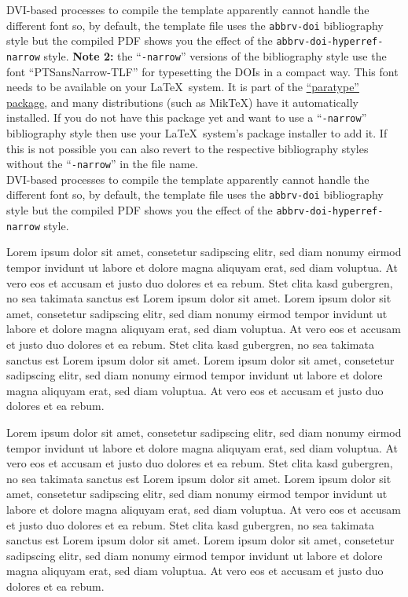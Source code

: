 \documentclass[preprint,journal]{vgtc}       %
\begin{document}
\begin{itemize}
DVI-based processes to compile the template apparently cannot handle the different font so, by default, the template file uses the \texttt{abbrv-doi} bibliography style but the compiled PDF shows you the effect of the \texttt{abbrv-doi-hyperref-narrow} style.
\textbf{Note 2:} the ``\texttt{-narrow}'' versions of the bibliography style use the font ``PTSansNarrow-TLF'' for typesetting the DOIs in a compact way. This font needs to be available on your \LaTeX\ system. It is part of the \href{https://www.ctan.org/pkg/paratype}{``paratype'' package}, and many distributions (such as MikTeX) have it automatically installed. If you do not have this package yet and want to use a ``\texttt{-narrow}'' bibliography style then use your \LaTeX\ system's package installer to add it. If this is not possible you can also revert to the respective bibliography styles without the ``\texttt{-narrow}'' in the file name.\\[1em]
DVI-based processes to compile the template apparently cannot handle the different font so, by default, the template file uses the \texttt{abbrv-doi} bibliography style but the compiled PDF shows you the effect of the \texttt{abbrv-doi-hyperref-narrow} style.
\end{itemize}

Lorem ipsum dolor sit amet, consetetur sadipscing elitr, sed diam
nonumy eirmod tempor invidunt ut labore et dolore magna aliquyam erat,
sed diam voluptua. At vero eos et accusam et justo duo dolores et ea
rebum. Stet clita kasd gubergren, no sea takimata sanctus est Lorem
ipsum dolor sit amet. Lorem ipsum dolor sit amet, consetetur
sadipscing elitr, sed diam nonumy eirmod tempor invidunt ut labore et
dolore magna aliquyam erat, sed diam voluptua. At vero eos et accusam
et justo duo dolores et ea rebum. Stet clita kasd gubergren, no sea
takimata sanctus est Lorem ipsum dolor sit amet. Lorem ipsum dolor sit
amet, consetetur sadipscing elitr, sed diam nonumy eirmod tempor
invidunt ut labore et dolore magna aliquyam erat, sed diam
voluptua. At vero eos et accusam et justo duo dolores et ea
rebum.

Lorem ipsum dolor sit amet, consetetur sadipscing elitr, sed diam
nonumy eirmod tempor invidunt ut labore et dolore magna aliquyam erat,
sed diam voluptua. At vero eos et accusam et justo duo dolores et ea
rebum. Stet clita kasd gubergren, no sea takimata sanctus est Lorem
ipsum dolor sit amet. Lorem ipsum dolor sit amet, consetetur
sadipscing elitr, sed diam nonumy eirmod tempor invidunt ut labore et
dolore magna aliquyam erat, sed diam voluptua. At vero eos et accusam
et justo duo dolores et ea rebum. Stet clita kasd gubergren, no sea
takimata sanctus est Lorem ipsum dolor sit amet. Lorem ipsum dolor sit
amet, consetetur sadipscing elitr, sed diam nonumy eirmod tempor
invidunt ut labore et dolore magna aliquyam erat, sed diam
voluptua. At vero eos et accusam et justo duo dolores et ea
rebum.
\end{document}
